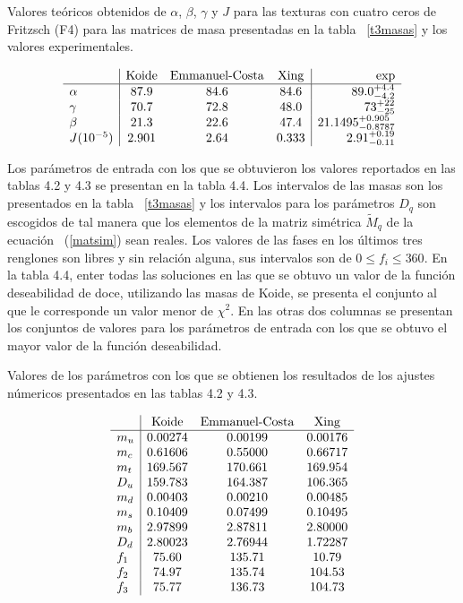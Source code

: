 {\tiny
\begin{table}[h!]\label{tra2}
\caption{Valores te\'oricos obtenidos de $\alpha$, $\beta$, $\gamma$ y $J$ para 
las texturas con cuatro ceros de Fritzsch (F4) para las matrices de masa presentadas en la tabla ~\ref{t3masas} y los valores experimentales.}
$$\ba{l|ccc|r}
 & \mbox{Koide} & \mbox{Emmanuel-Costa} & \mbox{Xing} &\mbox{exp}\\ \hline
\alpha & 87.9 & 84.6 & 84.6 & 89.0^{+4.4}_{-4.2}  \\
\gamma & 70.7 & 72.8 & 48.0 & 73^{+22}_{-25}      \\
\beta  & 21.3 & 22.6 & 47.4 & 21.1495^{+0.905}_{-0.8787} \\
J (10^{-5})& 2.901 & 2.64 & 0.333 & 
2.91^{+0.19}_{-0.11} \\
\ea
$$\end{table} }

Los par\'ametros de entrada con los que se obtuvieron los valores reportados
en las tablas 4.2 y 4.3 se presentan en la tabla 4.4. Los intervalos de las
masas son los presentados en la tabla ~\ref{t3masas} y los intervalos para los
par\'ametros $D_q$ son escogidos de tal manera que los elementos de la matriz
sim\'etrica $\tilde M_q$ de la ecuaci\'on ~(\ref{matsim}) sean reales. Los
valores de las fases en los \'ultimos tres renglones son libres y sin relaci\'on
alguna, sus intervalos son de $0\leq f_i\leq 360$. En la tabla 4.4, enter todas
las soluciones en las que se obtuvo un valor de la funci\'on deseabilidad de
doce, utilizando las masas de Koide, se presenta el conjunto al que le
corresponde un valor menor de $\chi^2$. En las otras dos columnas se presentan
los conjuntos de valores para los par\'ametros de entrada con los que se obtuvo
el mayor valor de la funci\'on deseabilidad.

{\tiny
\begin{table}[h!]\label{trare}
\caption{Valores de los par\'ametros con los que se obtienen los resultados de
los ajustes n\'umericos presentados en las tablas 4.2 y 4.3.}
$$\ba{l|ccc}
 & \mbox{Koide} & \mbox{Emmanuel-Costa} & \mbox{Xing} \\ \hline
m_u & 0.00274 & 0.00199 & 0.00176 \\
m_c & 0.61606 & 0.55000 & 0.66717 \\
m_t & 169.567 & 170.661 & 169.954 \\
D_u & 159.783 & 164.387 & 106.365 \\
m_d & 0.00403 & 0.00210 & 0.00485 \\
m_s & 0.10409 & 0.07499 & 0.10495 \\
m_b & 2.97899 & 2.87811 & 2.80000 \\
D_d & 2.80023 & 2.76944 & 1.72287 \\
f_1 & 75.60   & 135.71  & 10.79   \\
f_2 & 74.97   & 135.74  & 104.53  \\
f_3 & 75.77   & 136.73  & 104.73  \\
\ea
$$\end{table} }

